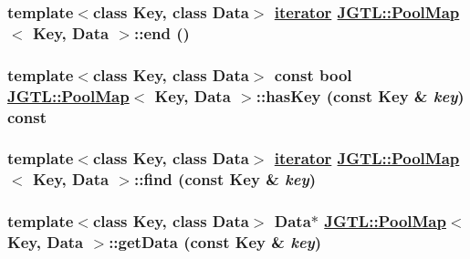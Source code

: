 \hypertarget{class_j_g_t_l_1_1_pool_map_8d356ec14bedcd97fc2428ee7c7ba75b}{
\subsubsection[end]{\setlength{\rightskip}{0pt plus 5cm}template$<$class Key, class Data$>$ \hyperlink{class_j_g_t_l_1_1_pool_map_b3af40821696ebcf9f62a3e9d91324ee}{iterator} \hyperlink{class_j_g_t_l_1_1_pool_map}{JGTL::Pool\-Map}$<$ Key, Data $>$::end ()}}
\label{class_j_g_t_l_1_1_pool_map_8d356ec14bedcd97fc2428ee7c7ba75b}


\hypertarget{class_j_g_t_l_1_1_pool_map_ed7f7adf472a3cb6be038adafcd1db70}{
\subsubsection[hasKey]{\setlength{\rightskip}{0pt plus 5cm}template$<$class Key, class Data$>$ const bool \hyperlink{class_j_g_t_l_1_1_pool_map}{JGTL::Pool\-Map}$<$ Key, Data $>$::has\-Key (const Key \& {\em key}) const}}
\label{class_j_g_t_l_1_1_pool_map_ed7f7adf472a3cb6be038adafcd1db70}


\hypertarget{class_j_g_t_l_1_1_pool_map_bbf48a295265f59eb595e7695997ac14}{
\subsubsection[find]{\setlength{\rightskip}{0pt plus 5cm}template$<$class Key, class Data$>$ \hyperlink{class_j_g_t_l_1_1_pool_map_b3af40821696ebcf9f62a3e9d91324ee}{iterator} \hyperlink{class_j_g_t_l_1_1_pool_map}{JGTL::Pool\-Map}$<$ Key, Data $>$::find (const Key \& {\em key})}}
\label{class_j_g_t_l_1_1_pool_map_bbf48a295265f59eb595e7695997ac14}


\hypertarget{class_j_g_t_l_1_1_pool_map_097cdf2c2bae8f59db2849a7b62f82d0}{
\subsubsection[getData]{\setlength{\rightskip}{0pt plus 5cm}template$<$class Key, class Data$>$ Data$\ast$ \hyperlink{class_j_g_t_l_1_1_pool_map}{JGTL::Pool\-Map}$<$ Key, Data $>$::get\-Data (const Key \& {\em key})}}
\label{class_j_g_t_l_1_1_pool_map_097cdf2c2bae8f59db2849a7b62f82d0}


